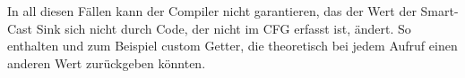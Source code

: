 In all diesen Fällen kann der Compiler nicht garantieren, das der Wert der Smart-Cast Sink sich nicht durch Code,
der nicht im CFG erfasst ist, ändert.
So enthalten  und  zum Beispiel custom Getter, die theoretisch bei jedem Aufruf einen
anderen Wert zurückgeben könnten.\cite{kspecSmartCasts}

\renewcommand{\kapitelautor}{}

